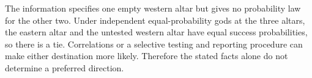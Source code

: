 The information specifies one empty western altar but gives no probability law for the other two. Under independent equal-probability gods at the three altars, the eastern altar and the untested western altar have equal success probabilities, so there is a tie. Correlations or a selective testing and reporting procedure can make either destination more likely. Therefore the stated facts alone do not determine a preferred direction.

